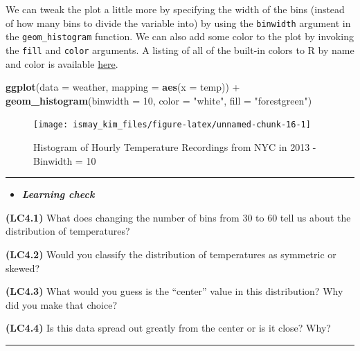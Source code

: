 \documentclass[]{tufte-book}
\newenvironment{Shaded}{\begin{snugshade}}{\end{snugshade}}
\newcommand{\KeywordTok}[1]{\textcolor[rgb]{0.13,0.29,0.53}{\textbf{{#1}}}}
\newcommand{\DataTypeTok}[1]{\textcolor[rgb]{0.13,0.29,0.53}{{#1}}}
\newcommand{\DecValTok}[1]{\textcolor[rgb]{0.00,0.00,0.81}{{#1}}}
\newcommand{\StringTok}[1]{\textcolor[rgb]{0.31,0.60,0.02}{{#1}}}
\newcommand{\NormalTok}[1]{{#1}}
\newenvironment{rmdblock}[1]
  {\begin{shaded*}
  \begin{itemize}
  \renewcommand{\labelitemi}{
    \raisebox{-.7\height}[0pt][0pt]{
    }
  }
  \item
  }
  {
  \end{itemize}
  \end{shaded*}
  }
\newenvironment{learncheck}
  {\begin{rmdblock}{warning}}
  {\end{rmdblock}}
\begin{document}
We can tweak the plot a little more by specifying the width of the bins
(instead of how many bins to divide the variable into) by using the
\texttt{binwidth} argument in the \texttt{geom\_histogram} function. We
can also add some color to the plot by invoking the \texttt{fill} and
\texttt{color} arguments. A listing of all of the built-in colors to R
by name and color is available
\href{http://www.stat.columbia.edu/~tzheng/files/Rcolor.pdf}{here}.

\begin{Shaded}
\begin{Highlighting}[]
\KeywordTok{ggplot}\NormalTok{(}\DataTypeTok{data =} \NormalTok{weather, }\DataTypeTok{mapping =} \KeywordTok{aes}\NormalTok{(}\DataTypeTok{x =} \NormalTok{temp)) +}
\StringTok{  }\KeywordTok{geom_histogram}\NormalTok{(}\DataTypeTok{binwidth =} \DecValTok{10}\NormalTok{, }\DataTypeTok{color =} \StringTok{"white"}\NormalTok{, }\DataTypeTok{fill =} \StringTok{"forestgreen"}\NormalTok{)}
\end{Highlighting}
\end{Shaded}

\begin{figure}
\texttt{[image: ismay\_kim\_files/figure-latex/unnamed-chunk-16-1]} \caption[Histogram of Hourly Temperature Recordings from NYC in 2013 - Binwidth = 10]{Histogram of Hourly Temperature Recordings from NYC in 2013 - Binwidth = 10}\label{fig:unnamed-chunk-16}
\end{figure}

\begin{center}\rule{0.5\linewidth}{\linethickness}\end{center}

\begin{learncheck}
\textbf{\emph{Learning check}}
\end{learncheck}

\textbf{(LC4.1)} What does changing the number of bins from 30 to 60
tell us about the distribution of temperatures?

\textbf{(LC4.2)} Would you classify the distribution of temperatures as
symmetric or skewed?

\textbf{(LC4.3)} What would you guess is the ``center'' value in this
distribution? Why did you make that choice?

\textbf{(LC4.4)} Is this data spread out greatly from the center or is
it close? Why?

\begin{center}\rule{0.5\linewidth}{\linethickness}\end{center}
\end{document}
